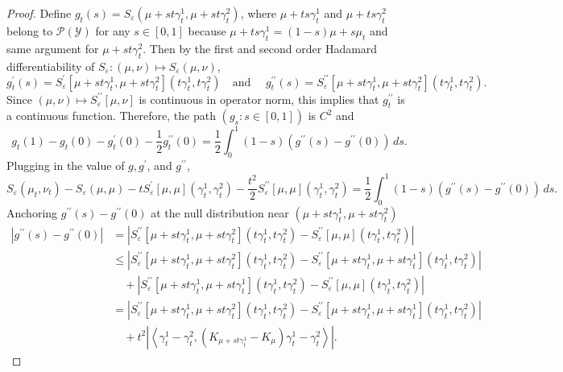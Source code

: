 \documentclass{article}
\theoremstyle{plain}
\theoremstyle{definition}
\theoremstyle{remark}
\newcommand{\abs}[1]{\left|#1\right|}
\newcommand{\cP}{\mathcal{P}}
\newcommand{\cY}{\mathcal{Y}}
\newcommand{\1}{\mathbbm{1}}
\newcommand{\eps}{\varepsilon}
\newcommand{\iprod}[1]{\left\langle #1 \right\rangle}
\theoremstyle{plain}
\theoremstyle{definition}
\newcommand{\tand}{\textrm{and }}
\begin{document}
\begin{proof}
    Define $g_t(s) = S_\eps(\mu + st\gamma_t^1, \mu + st\gamma_t^2)$, where $\mu + ts\gamma_t^1$ and $\mu + ts\gamma_t^2$ belong to $\cP(\cY)$ for any $s \in [0,1]$ because $\mu + ts\gamma_t^1 = (1-s) \mu + s\mu_t$ and same argument for $\mu + st \gamma_t^2$. Then by the first and second order Hadamard differentiability of $S_\eps: (\mu, \nu) \mapsto S_\eps(\mu, \nu)$, 
    \[
    g_t^\prime(s) = S_\eps^\prime[\mu+st\gamma_t^1, \mu+st\gamma_t^2](t\gamma_t^1, t\gamma_t^2) \quad \tand \quad g_t^{\prime\prime}(s) = S_\eps^{\prime\prime}[\mu+st\gamma_t^1, \mu+st\gamma_t^2](t\gamma_t^1, t\gamma_t^2).
    \]
    Since $(\mu, \nu) \mapsto S_\eps^{\prime\prime}[\mu, \nu]$ is continuous in operator norm, this implies that $g_t^{\prime\prime}$ is a continuous function. Therefore, the path $(g_s : s\in[0,1])$ is $C^2$ and
    \[
    g_t(1) - g_t(0) - g_t^\prime(0) - \frac{1}{2} g_t^{\prime\prime}(0) = \frac{1}{2}\int_0^1 (1-s) (g^{\prime\prime}(s) - g^{\prime\prime}(0)) \, ds.
    \]
    Plugging in the value of $g, g^\prime$, and $g^{\prime\prime}$,
    \[
    S_\eps(\mu_t, \nu_t) - S_\eps(\mu, \mu) - t S_\eps^\prime[\mu, \mu](\gamma_t^1, \gamma_t^2) - \frac{t^2}{2} S_\eps^{\prime\prime}[\mu, \mu](\gamma_t^1, \gamma_t^2) = \frac{1}{2}\int_0^1 (1-s) (g^{\prime\prime}(s) - g^{\prime\prime}(0)) \, ds.
    \]
    Anchoring $g^{\prime\prime}(s) - g^{\prime\prime}(0)$ at the null distribution near $(\mu + st \gamma_t^1, \mu + st \gamma_t^2)$
    \begin{align*}
        \abs{g^{\prime\prime}(s) - g^{\prime\prime}(0)} &= \abs{S_\eps^{\prime\prime}[\mu+st\gamma_t^1, \mu+st\gamma_t^2](t\gamma_t^1, t\gamma_t^2) - S_\eps^{\prime\prime}[\mu, \mu](t\gamma_t^1, t\gamma_t^2)}\\
        &\leq \abs{S_\eps^{\prime\prime}[\mu+st\gamma_t^1, \mu+st\gamma_t^2](t\gamma_t^1, t\gamma_t^2) - S_\eps^{\prime\prime}[\mu+st\gamma_t^1, \mu+st\gamma_t^1](t\gamma_t^1, t\gamma_t^2)}\\
        & \quad + \abs{S_\eps^{\prime\prime}[\mu+st\gamma_t^1, \mu+st\gamma_t^1](t\gamma_t^1, t\gamma_t^2) - S_\eps^{\prime\prime}[\mu, \mu](t\gamma_t^1, t\gamma_t^2)}\\
        &= \abs{S_\eps^{\prime\prime}[\mu+st\gamma_t^1, \mu+st\gamma_t^2](t\gamma_t^1, t\gamma_t^2) - S_\eps^{\prime\prime}[\mu+st\gamma_t^1, \mu+st\gamma_t^1](t\gamma_t^1, t\gamma_t^2)}\\
        & \quad + t^2 \abs{\iprod{\gamma_t^1-\gamma_t^2, (K_{\mu + st\gamma_t^1} - K_{\mu}) \gamma_t^1-\gamma_t^2}}.

\end{align*}
\end{proof}
\end{document}
